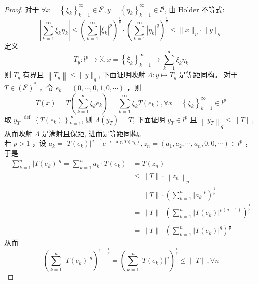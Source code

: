 \documentclass[lang=cn,newtx,10pt,scheme=chinese,thmcnt=chapter]{elegantbook}
\begin{document}
\begin{proof}
对于 $\forall x=\left\{\xi_k\right\}_{k=1}^{\infty} \in l^p, y=\left\{\eta_k\right\}_{k=1}^{\infty} \in l^q$, 由 Holder 不等式:
\begin{equation*}
\left|\sum_{k=1}^{\infty} \xi_k \eta_k\right| \leqslant\left(\sum_{k=1}^{\infty}\left|\xi_k\right|^p\right)^{\frac{1}{p}} \cdot\left(\sum_{k=1}^{\infty}\left|\eta_k\right|^q\right)^{\frac{1}{q}} \leqslant\|x\|_p \cdot\|y\|_q
\end{equation*}
定义
\begin{equation*}
T_y: l^p \rightarrow \mathbb{K} , x=\left\{\xi_k\right\}_{k=1}^{\infty} \mapsto \sum_{k=1}^{\infty} \xi_k \eta_k
\end{equation*}
则 $T_y$ 有界且 $\left\|T_y\right\| \leqslant\|y\|_q$, 下面证明映射 $\Lambda: y \mapsto T_y$ 是等距同构。
对于 $T \in\left(l^p\right)^*$ ，令 $e_k=(0, \cdots, 0,1,0, \cdots)$ ，则
\begin{equation*}
T(x)=T\left(\sum_{k=1}^{\infty} \xi_k e_k\right)=\sum_{k=1}^{\infty} \xi_k T\left(e_k\right), \forall x=\left\{\xi_k\right\}_{k=1}^{\infty} \in l^p
\end{equation*}
取 $y_T \stackrel{\text { def }}{=}\left\{T\left(e_k\right)\right\}_{k=1}^{\infty}$, 则 $\Lambda\left(y_T\right)=T$, 下面证明 $y_T \in l^p$ 且 $\left\|y_T\right\|_q \leqslant\|T\|$, 从而映射 $\Lambda$ 是满射且保距, 进而是等距同构。\\
若 $p>1$ ，设 $a_k=\left|T\left(e_k\right)\right|^{q-1} e ^{- i \cdot \arg T\left(e_k\right)}, z_n=\left(a_1, a_2, \cdots, a_n, 0,0, \cdots\right) \in l^p$ ，于是
\begin{equation*}
\begin{aligned}
\sum_{k=1}^n\left|T\left(e_k\right)\right|^q=\sum_{k=1}^n a_k \cdot T\left(e_k\right) & =T\left(z_n\right) \\
& \leqslant\|T\| \cdot\left\|z_n\right\|_p \\
& =\|T\| \cdot\left(\sum_{k=1}^n\left|a_k\right|^p\right)^{\frac{1}{p}} \\
& =\|T\| \cdot\left(\sum_{k=1}^n\left|T\left(e_k\right)\right|^{p(q-1)}\right)^{\frac{1}{p}} \\
& =\|T\| \cdot\left(\sum_{k=1}^n\left|T\left(e_k\right)\right|^q\right)^{\frac{1}{p}}
\end{aligned}
\end{equation*}
从而
\begin{equation*}
\left(\sum_{k=1}^n\left|T\left(e_k\right)\right|^q\right)^{1-\frac{1}{p}}=\left(\sum_{k=1}^n\left|T\left(e_k\right)\right|^q\right)^{\frac{1}{q}} \leqslant\|T\|, \forall n

\end{equation*}
\end{proof}
\end{document}
